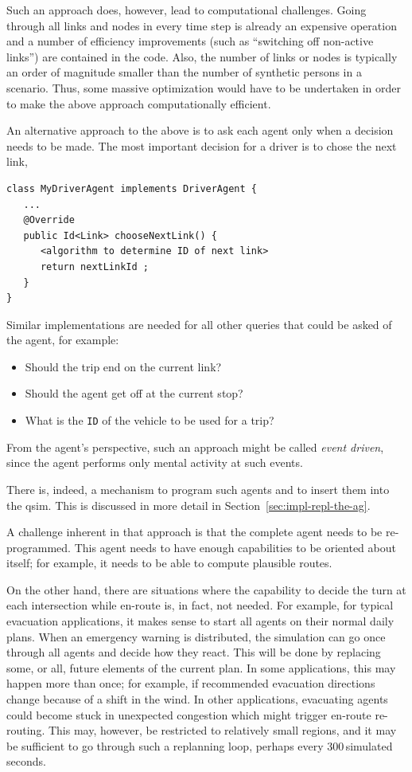Such an approach does, however, lead to computational challenges. Going through all links and nodes in every time step is already an expensive operation and a number of efficiency improvements (such as ``switching off non-active links'') are contained in the code.  Also, the number of links or nodes is typically an order of magnitude smaller than the number of synthetic persons in a scenario. Thus, some massive optimization would have to be undertaken in order to make the above approach computationally efficient.

An alternative approach to the above is to ask each agent only when a decision needs to be made. The most important decision for a driver is to chose the next link, \ie 
%
\begin{lstlisting}
class MyDriverAgent implements DriverAgent {
   ...
   @Override
   public Id<Link> chooseNextLink() {
      <algorithm to determine ID of next link>
      return nextLinkId ;
   }
}
\end{lstlisting}
%
Similar implementations are needed for all other queries that could be asked of the agent, for example:
\begin{itemize}\styleItemize
\item Should the trip end on the current link?
\item Should the agent get off at the current stop?
\item What is the \lstinline|ID| of the vehicle to be used for a trip?
\end{itemize}
%
From the agent's perspective, such an approach might be called \emph{event driven}, since the agent performs only mental activity at such events.

There is, indeed, a mechanism to program such agents and to insert
them into the \gls{qsim}. This is discussed in more detail in Section~\ref{sec:impl-repl-the-ag}.

A challenge inherent in that approach is that the complete agent needs to be re-programmed.  This agent needs to have enough capabilities to be oriented about itself; for example, it needs to be able to compute plausible routes.

On the other hand, there are situations where the capability to decide the turn at each intersection while en-route is, in fact, not needed.  
%
For example, for typical evacuation applications, it makes sense to start all agents on their normal daily plans. When an emergency warning is distributed, the simulation can go once through all agents and decide how they react. This will be done by replacing some, or all, future elements of the current plan. In some applications, this may happen more than once; for example, if recommended evacuation directions change because of a shift in the wind. In other applications, evacuating agents could become stuck in unexpected congestion which might trigger en-route re-routing. This may, however, be restricted to relatively small regions, and it may be sufficient to go through such a replanning loop, perhaps every 300\,simulated seconds. 

